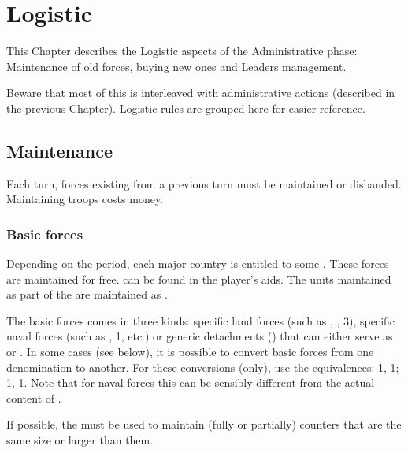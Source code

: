 
\chapter{Logistic}\label{chapter:Logistic}
\begin{designnote}
  This Chapter describes the Logistic aspects of the Administrative phase:
  Maintenance of old forces, buying new ones and Leaders management.

  Beware that most of this is interleaved with administrative actions
  (described in the previous Chapter). Logistic rules are grouped here for
  easier reference.
\end{designnote}





\section{Maintenance}\label{chLogistic:Maintenance}

\aparag Each turn, forces existing from a previous turn must be maintained or
disbanded. Maintaining troops costs money.



\subsection{Basic forces}

\aparag Depending on the period, each major country is entitled to some
. These forces are maintained for free.  can be found in the player's aids.
\bparag The units maintained as part of the  are
maintained as .

\aparag The basic forces comes in three kinds: specific land forces (such as
\ARMY\faceplus, \ARMY\facemoins, 3\LD), specific naval forces (such as
\FLEET\faceplus, 1\ND, etc.) or generic detachments (\GD) that can either
serve as \LD or \ND.
\bparag In some cases (see below), it is possible to convert basic forces from
one denomination to another. For these conversions (only), use the
equivalences: 1\ARMY{}\LD, 1\ARMY{}\ARMY{}\LD ;
1\FLEET{}\ND, 1\FLEET{}\FLEET{}\ND. Note that for
naval forces this can be sensibly different from the actual content of \FLEET.

\aparag If possible, the  must be used to maintain (fully
or partially) counters that are the same size or larger than them.

